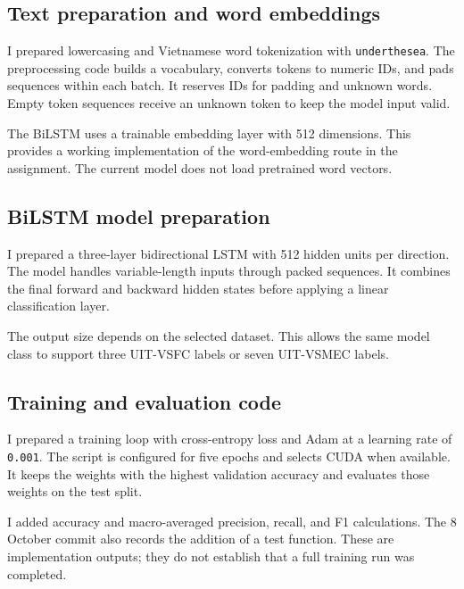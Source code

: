 \documentclass[11pt,a4paper]{article}
\begin{document}
\subsection{Text preparation and word embeddings}
I prepared lowercasing and Vietnamese word tokenization with \texttt{underthesea}. The preprocessing code builds a vocabulary, converts tokens to numeric IDs, and pads sequences within each batch. It reserves IDs for padding and unknown words. Empty token sequences receive an unknown token to keep the model input valid.

The BiLSTM uses a trainable embedding layer with 512 dimensions. This provides a working implementation of the word-embedding route in the assignment. The current model does not load pretrained word vectors.

\subsection{BiLSTM model preparation}
I prepared a three-layer bidirectional LSTM with 512 hidden units per direction. The model handles variable-length inputs through packed sequences. It combines the final forward and backward hidden states before applying a linear classification layer.

The output size depends on the selected dataset. This allows the same model class to support three UIT-VSFC labels or seven UIT-VSMEC labels.

\subsection{Training and evaluation code}
I prepared a training loop with cross-entropy loss and Adam at a learning rate of \texttt{0.001}. The script is configured for five epochs and selects CUDA when available. It keeps the weights with the highest validation accuracy and evaluates those weights on the test split.

I added accuracy and macro-averaged precision, recall, and F1 calculations. The 8 October commit also records the addition of a test function. These are implementation outputs; they do not establish that a full training run was completed.
\end{document}
